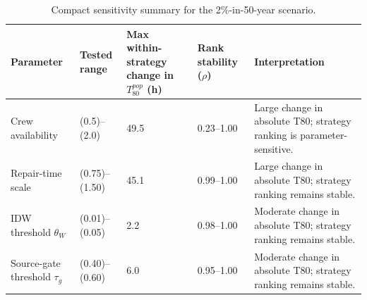 \begin{table}
\caption{Compact sensitivity summary for the 2\%-in-50-year scenario.}
\begin{tabular}{lllll}
\hline
Parameter & Tested range & Max within-strategy change in $T_{80}^{pop}$ (h) & Rank stability ($\rho$) & Interpretation \\
\hline
Crew availability & (0.5)–(2.0) & 49.5 & 0.23–1.00 & Large change in absolute T80; strategy ranking is parameter-sensitive. \\
Repair-time scale & (0.75)–(1.50) & 45.1 & 0.99–1.00 & Large change in absolute T80; strategy ranking remains stable. \\
IDW threshold $\theta_W$ & (0.01)–(0.05) & 2.2 & 0.98–1.00 & Moderate change in absolute T80; strategy ranking remains stable. \\
Source-gate threshold $\tau_g$ & (0.40)–(0.60) & 6.0 & 0.95–1.00 & Moderate change in absolute T80; strategy ranking remains stable. \\
\hline
\end{tabular}
\end{table}
